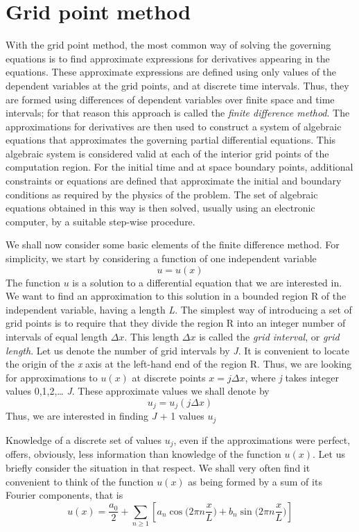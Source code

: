 \section{Grid point method}
With the grid point method, the most common way of solving the governing equations is to find approximate expressions for derivatives appearing in the equations. These approximate expressions are defined using only values of the dependent variables at the grid points, and at discrete time intervals. Thus, they are formed using differences of dependent variables over finite space and time intervals; for that reason this approach is called the \textit{finite difference method}. The approximations for derivatives are then used to construct a system of algebraic equations that approximates the governing partial differential equations. This algebraic system is considered valid at each of the interior grid points of the computation region. For the initial time and at space boundary points, additional constraints or equa­tions are defined that approximate the initial and bound­ary conditions as required by the physics of the problem. The set of algebraic equations obtained in this way is then solved, usually using an electronic computer, by a suitable step-wise procedure.

We shall now consider some basic elements of the finite difference method. For simplicity, we start by considering a function of one independent variable $$u=u(x)$$
The function $u$ is a solution to a differential equation that we are interested in. We want to find an approxima­tion to this solution in a bounded region R of the inde­pendent variable, having a length \textit{L}. The simplest way of introducing a set of grid points is to require that they divide the region R into an integer number of intervals of equal length $\Delta x$. This length $\Delta x$ is called the \textit{grid interval}, or \textit{grid length}. Let us denote the number of grid intervals by \textit{J}. It is convenient to locate the origin of the \textit{x} axis at the left-hand end of the region R. Thus, we are looking for approximations to $u(x)$ at discrete points $x=j\Delta x$, where \textit{j} takes integer values 0,1,2,… \textit{J}. These approximate values we shall denote by $$u_j=u_j(j\Delta x)$$
Thus, we are interested in finding \textit{J} + 1 values $u_j$

Knowledge of a discrete set of values $u_j$, even if the approximations were perfect, offers, obviously, less information than knowledge of the function $u(x)$. Let us briefly consider the situation in that respect. We shall very often find it convenient to think of the function $u(x)$ as being formed by a sum of its Fourier compo­nents, that is
$$u(x)=\frac{a_0}{2}+\displaystyle\sum_{n\geq 1}[a_n\cos\big(2\pi n\frac{x}{L}\big)+b_n\sin\big(2\pi n\frac{x}{L}\big)]$$

